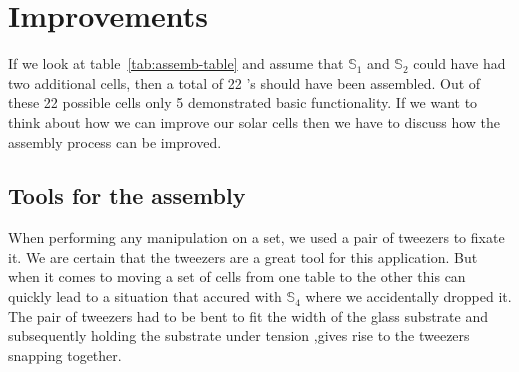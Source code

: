 
\section{Improvements}
If we look at table~\ref{tab:assemb-table} and assume that $\mathbb{S}_1$ and $\mathbb{S}_2$ could have had two additional cells, then a total of 22 \BHSC’s should have been assembled. Out of these 22 possible cells only 5 demonstrated basic functionality. If we want to think about how we can improve our solar cells then we have to discuss how the assembly process can be improved.

\subsection{Tools for the assembly}
When performing any manipulation on a set, we used a pair of tweezers to fixate it. We are certain that the tweezers are a great tool for this application. But when it comes to moving a set of cells from one table to the other this can quickly lead to a situation that accured with $\mathbb{S}_4$ where we accidentally dropped it. The pair of tweezers had to be bent to fit the width of the glass substrate and subsequently holding the substrate under tension ,gives rise to the tweezers snapping together.

